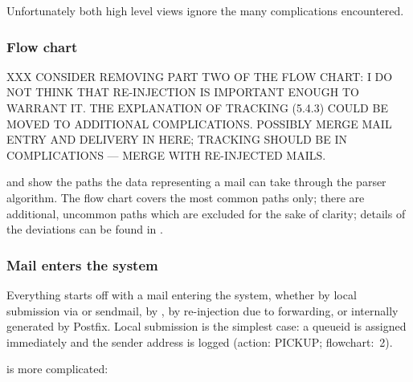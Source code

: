Unfortunately both high level views ignore the many complications
encountered.


\subsubsection{Flow chart}

\label{flow-chart}

XXX CONSIDER REMOVING PART TWO OF THE FLOW CHART\@: I DO NOT THINK THAT
RE-INJECTION IS IMPORTANT ENOUGH TO WARRANT IT\@.  THE EXPLANATION OF
TRACKING (\textsection{}5.4.3) COULD BE MOVED TO ADDITIONAL
COMPLICATIONS\@.  POSSIBLY MERGE MAIL ENTRY AND DELIVERY IN HERE\@;
TRACKING SHOULD BE IN COMPLICATIONS --- MERGE WITH RE-INJECTED MAILS\@.

 and  show the paths the data representing a mail can take
through the parser algorithm.  The flow chart covers the most common paths
only; there are additional, uncommon paths which are excluded for the sake
of clarity; details of the deviations can be found in
.



\clearpage

\subsubsection{Mail enters the system}

\label{mail-enters-the-system}

Everything starts off with a mail entering the system, whether by local
submission via  or sendmail, by \SMTP{}, by re-injection
due to forwarding, or internally generated by Postfix.  Local submission is
the simplest case: a queueid is assigned immediately and the sender address
is logged (action: PICKUP\@; flowchart:~2).

\SMTP{} is more complicated:

